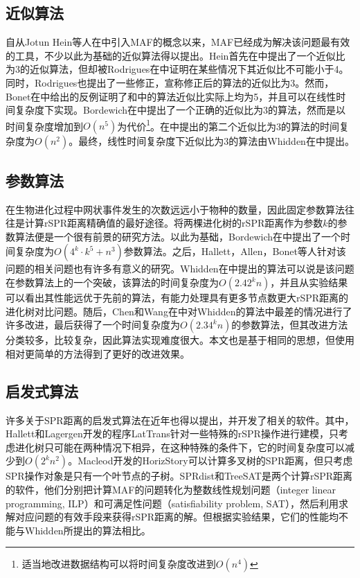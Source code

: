 \subsection{近似算法}
自从Jotun Hein等人在\cite{hein1996complexity}中引入MAF的概念以来，MAF已经成为解决该问题最有效的工具，不少以此为基础的近似算法得以提出。Hein首先在\cite{hein1996complexity}中提出了一个近似比为3的近似算法，但却被Rodrigues在\cite{rodrigues2007maximum}中证明在某些情况下其近似比不可能小于4。同时，Rodrigues也提出了一些修正，宣称修正后的算法的近似比为3。然而，Bonet在\cite{bonet2006approximating}中给出的反例证明了\cite{hein1996complexity}和\cite{rodrigues2007maximum}中的算法近似比实际上均为5，并且可以在线性时间复杂度下实现。Bordewich在\cite{bordewich20083}中提出了一个正确的近似比为3的算法，然而是以时间复杂度增加到$O(n^5)$为代价\footnote{适当地改进数据结构可以将时间复杂度改进到$O(n^4)$}。在\cite{rodrigues2007maximum}中提出的第二个近似比为3的算法的时间复杂度为$O(n^2)$。最终，线性时间复杂度下近似比为3的算法由Whidden在\cite{whidden2009unifying}中提出。                                                                                                                                                                                                                                                             
\subsection{参数算法}
在生物进化过程中网状事件发生的次数远远小于物种的数量，因此固定参数算法往往是计算rSPR距离精确值的最好途径。将两棵进化树的rSPR距离作为参数$k$的参数算法便是一个很有前景的研究方法。以此为基础，Bordewich在\cite{bordewich20083}中提出了一个时间复杂度为$O(4^k \cdot k^5 + n^3)$参数算法。之后，Hallett，Allen，Bonet等人针对该问题的相关问题也有许多有意义的研究。Whidden在\cite{whidden2010fast}中提出的算法可以说是该问题在参数算法上的一个突破，该算法的时间复杂度为$O(2.42^kn)$，并且从实验结果可以看出其性能远优于先前的算法，有能力处理具有更多节点数更大rSPR距离的进化树对比问题。随后，Chen和Wang在\cite{chen2012faster}中对Whidden的算法中最差的情况进行了许多改进，最后获得了一个时间复杂度为$O(2.34^kn)$的参数算法，但其改进方法分类较多，比较复杂，因此算法实现难度很大。本文也是基于相同的思想，但使用相对更简单的方法得到了更好的改进效果。

\subsection{启发式算法}
许多关于SPR距离的启发式算法在近年也得以提出，并开发了相关的软件。其中，Hallett和Lagergen开发的程序LatTrans针对一些特殊的rSPR操作进行建模，只考虑进化树只可能在两种情况下相异，在这种特殊的条件下，它的时间复杂度可以减少到$O(2^kn^2)$。Macleod开发的HorizStory可以计算多叉树的SPR距离，但只考虑SPR操作对象是只有一个叶节点的子树。SPRdist和TreeSAT是两个计算rSPR距离的软件，他们分别把计算MAF的问题转化为整数线性规划问题（integer linear programming, ILP）和可满足性问题（satisfiability problem, SAT），然后利用求解对应问题的有效手段来获得rSPR距离的解。但根据实验结果，它们的性能均不能与Whidden所提出的算法相比。

